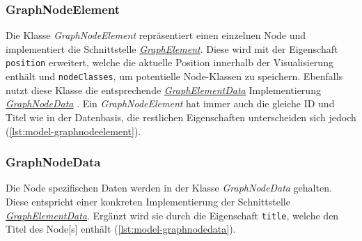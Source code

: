 
\subsubsection{GraphNodeElement}
\label{GraphNodeElement}
Die Klasse \textit{GraphNodeElement} repräsentiert einen einzelnen \gls{Node} und implementiert die Schnittstelle \hyperref[GraphElement]{\textit{GraphElement}}. Diese wird mit der Eigenschaft \texttt{position} erweitert, welche die aktuelle Position innerhalb der Visualisierung enthält und \texttt{nodeClasses}, um potentielle Node-Klassen zu speichern. Ebenfalls nutzt diese Klasse die entsprechende \hyperref[GraphElementData]{\textit{GraphElementData}} Implementierung \hyperref[GraphNodeData]{\textit{GraphNodeData}} . Ein \textit{GraphNodeElement} hat immer auch die gleiche ID und Titel wie in der Datenbasis, die restlichen Eigenschaften unterscheiden sich jedoch (\autoref{lst:model-graphnodeelement}).


\subsubsection{GraphNodeData}
\label{GraphNodeData}
Die \gls{Node} spezifischen Daten werden in der Klasse \textit{GraphNodeData} gehalten. Diese entspricht einer konkreten Implementierung der Schnittstelle \hyperref[GraphElementData]{\textit{GraphElementData}}. Ergänzt wird sie durch die Eigenschaft \texttt{title}, welche den Titel des \gls{Node}[s] enthält (\autoref{lst:model-graphnodedata}).



